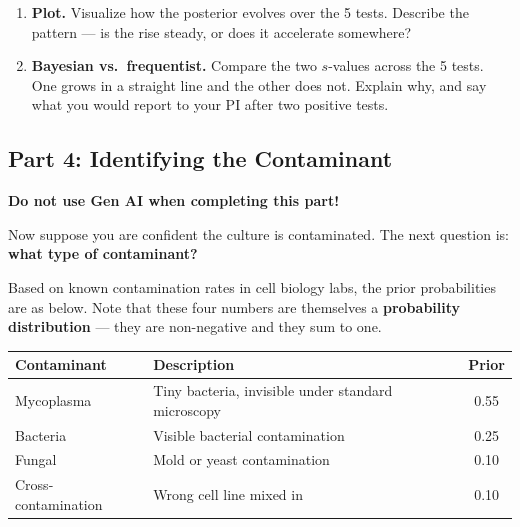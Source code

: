 \documentclass{article}
\begin{document}
\begin{enumerate}[label={\bfseries (\Alph*)},itemsep=.6em]
	\vspace{4em}

	\item \textbf{Plot.} Visualize how the posterior evolves over the 5 tests. Describe the pattern --- is the rise steady, or does it accelerate somewhere? \\[4em]

	\item \textbf{Bayesian vs.\ frequentist.} Compare the two $s$-values across the 5 tests. One grows in a straight line and the other does not. Explain why, and say what you would report to your PI after two positive tests. \\[5em]

\end{enumerate}

\newpage

\subsection*{Part 4: Identifying the Contaminant}
\textbf{\color{red} Do not use Gen AI when completing this part!}

Now suppose you are confident the culture is contaminated. The next question is: \textbf{what type of contaminant?}

\medskip
Based on known contamination rates in cell biology labs, the prior probabilities are as below. Note that these four numbers are themselves a \textbf{probability distribution} --- they are non-negative and they sum to one.

\begin{center}
\renewcommand{\arraystretch}{1.2}
\begin{tabular}{>{\raggedright\arraybackslash}p{3.7cm} >{\raggedright\arraybackslash}p{7.3cm} c}
\toprule
\textbf{Contaminant} & \textbf{Description} & \textbf{Prior} \\
\midrule
Mycoplasma & Tiny bacteria, invisible under standard microscopy & 0.55 \\
Bacteria & Visible bacterial contamination & 0.25 \\
Fungal & Mold or yeast contamination & 0.10 \\
Cross-contamination & Wrong cell line mixed in & 0.10 \\
\bottomrule
\end{tabular}
\end{center}

\medskip
\end{document}

